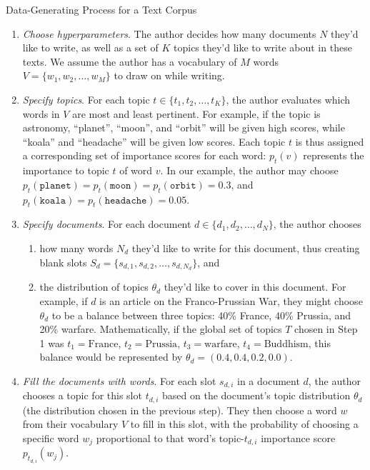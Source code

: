 \documentclass[11pt]{article}
\begin{document}
\begin{algorithm}[ht!]
	\caption{Data-Generating Process for a Text Corpus}
	\label{alg:text-corpus}
	\begin{enumerate}
		\item \textit{Choose hyperparameters}. The author decides how many documents $N$ they'd like to write, as well as a set of $K$ topics they'd like to write about in these texts. We assume the author has a vocabulary of $M$ words $V = \{w_1, w_2, \ldots, w_M\}$ to draw on while writing.
		\item \textit{Specify topics}. For each topic $t \in \{t_1, t_2, \ldots, t_K\}$, the author evaluates which words in $V$ are most and least pertinent. For example, if the topic is astronomy, ``planet'', ``moon'', and ``orbit'' will be given high scores, while ``koala'' and ``headache'' will be given low scores. Each topic $t$ is thus assigned a corresponding set of importance scores for each word: $p_t(v)$ represents the importance to topic $t$ of word $v$. In our example, the author may choose $p_t(\texttt{planet}) = p_t(\texttt{moon}) = p_t(\texttt{orbit}) = 0.3$, and $p_t(\texttt{koala}) = p_t(\texttt{headache}) = 0.05$.
		\item \textit{Specify documents}. For each document $d \in \{d_1, d_2, \ldots, d_N\}$, the author chooses
		\begin{enumerate}
			\item how many words $N_d$ they'd like to write for this document, thus creating blank slots $S_d = \{s_{d,1}, s_{d,2}, \ldots, s_{d,N_d}\}$, and
			\item the distribution of topics $\theta_d$ they'd like to cover in this document. For example, if $d$ is an article on the Franco-Prussian War, they might choose $\theta_d$ to be a balance between three topics: 40\% France, 40\% Prussia, and 20\% warfare. Mathematically, if the global set of topics $T$ chosen in Step 1 was $t_1 = \text{France}$, $t_2 = \text{Prussia}$, $t_3 = \text{warfare}$, $t_4 = \text{Buddhism}$, this balance would be represented by $\theta_d = (0.4, 0.4, 0.2, 0.0)$.
		\end{enumerate}
		\item \textit{Fill the documents with words}. For each slot $s_{d,i}$ in a document $d$, the author chooses a topic for this slot $t_{d,i}$ based on the document's topic distribution $\theta_d$ (the distribution chosen in the previous step). They then choose a word $w$ from their vocabulary $V$ to fill in this slot, with the probability of choosing a specific word $w_j$ proportional to that word's topic-$t_{d,i}$ importance score $p_{t_{d,i}}(w_j)$.
	\end{enumerate}
\end{algorithm}
\end{document}
